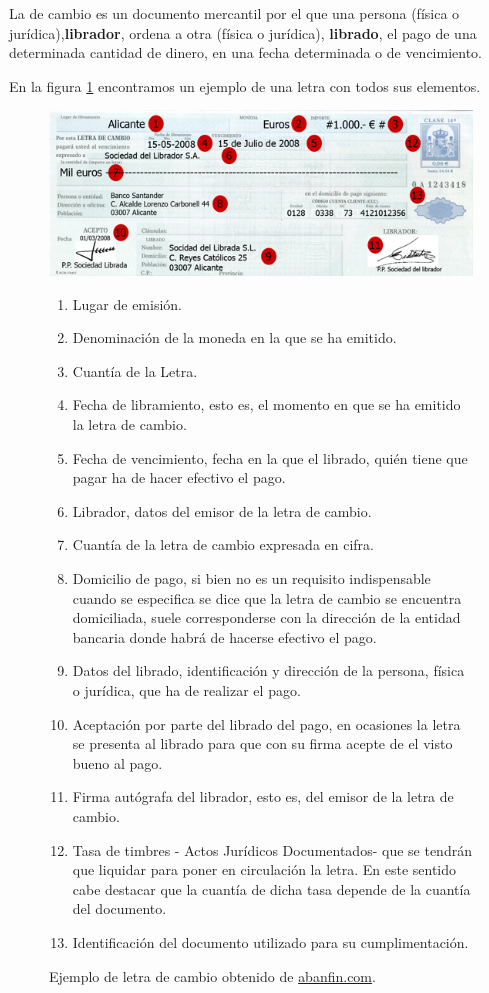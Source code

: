 \documentclass[nochap,palatino,shortheader]{apuntes}
\newcommand{\study}[1]{#1} \newcommand{\substudy}[1]{#1}
\begin{document}
La  de cambio es un documento mercantil por el que una persona (física o jurídica),\study{\textbf{librador}}, \substudy{ordena} a otra (física o jurídica), \study{\textbf{librado}}, el \substudy{pago} de una determinada cantidad de dinero, en una fecha determinada o de vencimiento.

En la figura \ref{fig:Letra} encontramos un ejemplo de una letra con todos sus elementos.

\begin{figure}[hbtp]
\centering
\includegraphics[width=\textwidth]{img/letra.jpg}
\caption{Ejemplo de letra de cambio obtenido de \href{http://www.abanfin.com/?tit=letra-de-cambio-caracteristicas&name=Manuales&fid=eh0bcao}{abanfin.com}.}
\label{fig:Letra}
\begin{enumerate}
  \itemsep-0em
\item Lugar de emisión.
\item Denominación de la moneda en la que se ha emitido.
\item Cuantía de la Letra.
\item Fecha de libramiento, esto es, el momento en que se ha emitido la letra de cambio.
\item Fecha de vencimiento, fecha en la que el librado, quién tiene que pagar ha de hacer efectivo el pago.
\item Librador, datos del emisor de la letra de cambio.
\item Cuantía de la letra de cambio expresada en cifra.
\item Domicilio de pago, si bien no es un requisito indispensable cuando se especifica se dice que la letra de cambio se encuentra domiciliada, suele corresponderse con la dirección de la entidad bancaria donde habrá de hacerse efectivo el pago.
\item Datos del librado, identificación y dirección de la persona, física o jurídica, que ha de realizar el pago.
\item Aceptación por parte del librado del pago, en ocasiones la letra se presenta al librado para que con su firma acepte de el visto bueno al pago.
\item Firma autógrafa del librador, esto es, del emisor de la letra de cambio.
\item Tasa de timbres - Actos Jurídicos Documentados- que se tendrán que liquidar para poner en circulación la letra. En este sentido cabe destacar que la cuantía de dicha tasa depende de la cuantía del documento.
\item Identificación del documento utilizado para su cumplimentación.
\end{enumerate}
\end{figure}
\end{document}
